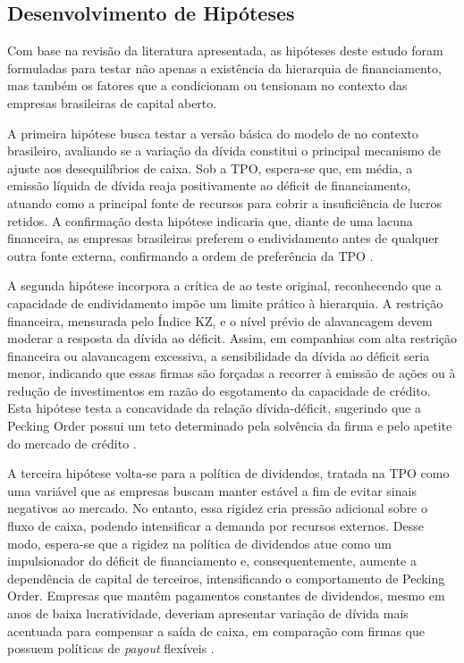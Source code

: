 \documentclass[a4paper,12pt]{article}
\begin{document}
\subsection{Desenvolvimento de Hipóteses}
 
Com base na revisão da literatura apresentada, as hipóteses deste estudo foram formuladas para testar não apenas a existência da hierarquia de financiamento, mas também os fatores que a condicionam ou tensionam no contexto das empresas brasileiras de capital aberto.
 
A primeira hipótese busca testar a versão básica do modelo de  no contexto brasileiro, avaliando se a variação da dívida constitui o principal mecanismo de ajuste aos desequilíbrios de caixa. Sob a TPO, espera-se que, em média, a emissão líquida de dívida reaja positivamente ao déficit de financiamento, atuando como a principal fonte de recursos para cobrir a insuficiência de lucros retidos. A confirmação desta hipótese indicaria que, diante de uma lacuna financeira, as empresas brasileiras preferem o endividamento antes de qualquer outra fonte externa, confirmando a ordem de preferência da TPO \cite{shyam1999}.
 
A segunda hipótese incorpora a crítica de  ao teste original, reconhecendo que a capacidade de endividamento impõe um limite prático à hierarquia. A restrição financeira, mensurada pelo Índice KZ, e o nível prévio de alavancagem devem moderar a resposta da dívida ao déficit. Assim, em companhias com alta restrição financeira ou alavancagem excessiva, a sensibilidade da dívida ao déficit seria menor, indicando que essas firmas são forçadas a recorrer à emissão de ações ou à redução de investimentos em razão do esgotamento da capacidade de crédito. Esta hipótese testa a concavidade da relação dívida-déficit, sugerindo que a Pecking Order possui um teto determinado pela solvência da firma e pelo apetite do mercado de crédito \cite{chirinko2000}.
 
A terceira hipótese volta-se para a política de dividendos, tratada na TPO como uma variável que as empresas buscam manter estável a fim de evitar sinais negativos ao mercado. No entanto, essa rigidez cria pressão adicional sobre o fluxo de caixa, podendo intensificar a demanda por recursos externos. Desse modo, espera-se que a rigidez na política de dividendos atue como um impulsionador do déficit de financiamento e, consequentemente, aumente a dependência de capital de terceiros, intensificando o comportamento de Pecking Order. Empresas que mantêm pagamentos constantes de dividendos, mesmo em anos de baixa lucratividade, deveriam apresentar variação de dívida mais acentuada para compensar a saída de caixa, em comparação com firmas que possuem políticas de \textit{payout} flexíveis \cite{Kakouris2025}.
\end{document}
